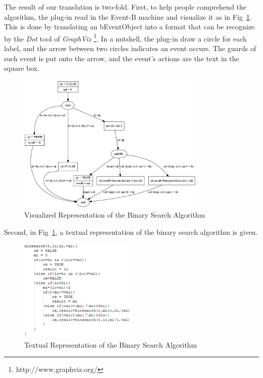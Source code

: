 \documentclass{easychair}
\begin{document}
The result of our translation is two-fold. First, to help people comprehend the algorithm, the plug-in read in the Event-B machine and visualize it as in Fig~\ref{fig:pix}. This is done by translating an bEventObject into a format that can be recognize by the \textit{Dot} tool of \textit{GraphViz} \footnote{http://www.graphviz.org/}. In a nutshell, the plug-in draw a circle for each label, and the arrow between two circles indicates an event occurs. The guards of such event is put onto the arrow, and the event's actions are the text in the square box. 

\begin{figure}[!h]
  \centering
    \includegraphics[width=0.8\textwidth]{img/pix.jpg}
  \caption{Visualized Representation of the Binary Search Algorithm}
  \label{fig:pix}
\end{figure}

Second, in Fig~\ref{fig:pix}, a textual representation of the binary search algorithm is given.
\begin{figure}[!h]
  \centering
    \includegraphics[width=0.5\textwidth]{img/alg.jpg}
  \caption{Textual Representation of the Binary Search Algorithm}
  \label{fig:alg}
\end{figure}
\end{document}
